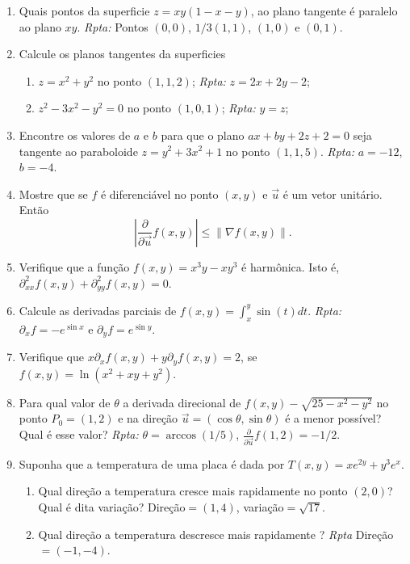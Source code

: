 \documentclass[11pt]{article}
\begin{document}
\begin{enumerate}
    \item Quais pontos da superficie $z=xy(1-x-y)$, ao plano tangente é paralelo ao plano $xy$. {\it Rpta: } Pontos $(0,0)$, $1/3(1,1)$, $(1,0)$ e $(0,1)$.
    \item Calcule os planos tangentes da superficies 
       \begin{enumerate}
       \item $z=x^{2}+y^{2}$ no ponto $(1,1,2)$; {\it Rpta: } $z=2x+2y-2$;
       \item $z^{2}-3x^{2}-y^{2}=0$ no ponto $(1,0,1)$; {\it Rpta: } $y=z$;
       \end{enumerate}
     \item Encontre os valores de $a$ e $b$ para que 
     o plano $ax+by+2z+2=0$ seja tangente ao paraboloide 
     $z=y^{2}+3x^{2}+1$  no ponto $(1,1,5)$.
     {\it Rpta: } $a=-12$, $b=-4$.   
    \item Mostre que se $f$ é diferenciável no ponto $(x,y)$ e $\overrightarrow{u}$ é um vetor unitário. Então 
     $$ |\frac{\partial}{\partial \overrightarrow{u}} f(x,y)|
     \leq \|\nabla f(x,y)\|.$$
    \item Verifique que a função $f(x,y)=x^{3}y-xy^{3}$ é harmônica. 
    Isto é, $\partial^{2}_{xx} f(x,y)+\partial^{2}_{yy} f(x,y)=0$.
     \item Calcule as derivadas parciais de $f(x,y)=\int_{x}^{y} \sin (t)dt$. {\it Rpta: } $\partial_{x} f=-e^{\sin x}$ e $\partial_{y} f=e^{\sin y}$.
     \item Verifique que $x \partial_{x} f(x,y)+y \partial_{y} f(x,y)=2$, 
     se $f(x,y)=\ln (x^{2}+xy+y^{2})$.
     \item Para qual valor de $\theta$ a derivada direcional de 
     $f(x,y)-\sqrt{25-x^{2}-y^{2}}$ no ponto $P_{0}=(1,2)$ e na direção 
     $\overrightarrow{u}=(\cos \theta, \sin \theta)$ é a menor possível?
     Qual é esse valor? 
     {\it Rpta: }  $\theta=\arccos(1/5)$, 
     $\frac{\partial}{\partial \overrightarrow{u}} f(1,2)=-1/2$. 
     \item Suponha que a temperatura de uma placa é dada 
     por $T(x,y)=xe^{2y}+y^{3}e^{x}$. 
        \begin{enumerate}
        \item Qual direção a temperatura cresce mais rapidamente no 
        ponto $(2,0)$? Qual é dita variação?
        {\it } Direção$=(1,4)$, variação$=\sqrt{17}$.
        \item Qual direção a temperatura descresce mais rapidamente ?
        {\it Rpta} Direção$= (-1,-4)$. 
        \end{enumerate}

\end{enumerate}
\end{document}
